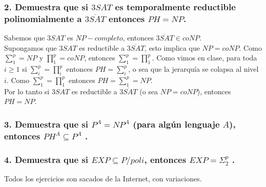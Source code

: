 \documentclass[12pt]{article}
\begin{document}
\subsubsection*{2. Demuestra que si $3SAT$ es temporalmente reductible polinomialmente a $\overline{3SAT}$ entonces $PH = NP$.}
Sabemos que $3SAT$ es $NP-completo$, entonces $\overline{3SAT} \in coNP$. \\
Supongamos que $3SAT$ es reductible a $\overline{3SAT}$, esto implica que $NP = coNP$. Como $\sum_1^p = NP$ y $\prod_1^p = coNP$, entonces $\sum_1^p = \prod_1^p$. Como vimos en clase, para toda $i \geq 1$ si $\sum_i^p = \prod_i^p$ entonces $PH = \sum_i^p$, o sea que la jerarquía se colapsa al nivel $i$. Como $\sum_1^p = \prod_1^p$ entonces $PH = \sum_1^p = NP$. \\
Por lo tanto si $3SAT$ es reductible a $\overline{3SAT}$ (o sea $NP = coNP$), entonces $PH = NP$.

\subsubsection*{3. Demuestra que si $P^A = NP^A$ (para algún lenguaje $A$), entonces $PH^A \subseteq P^A$ .}
\subsubsection*{4. Demuestra que si $EXP \subseteq P/poli$, entonces $EXP = \Sigma^p_2$ .}

Todos los ejercicios son sacados de la Internet, con variaciones.
\end{document}
